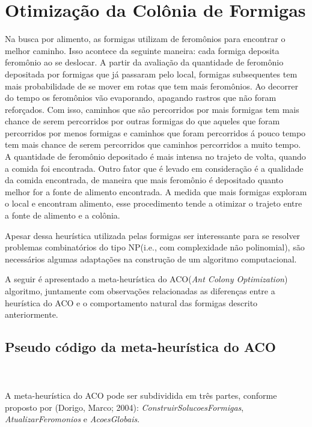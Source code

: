 \section{Otimização da Colônia de Formigas}

Na busca por alimento, as formigas utilizam de feromônios para encontrar o melhor caminho.
Isso acontece da seguinte maneira: cada formiga deposita feromônio ao se deslocar. A partir
da avaliação da quantidade de feromônio depositada por formigas que já passaram pelo local,
formigas subsequentes tem mais probabilidade de se mover em rotas que tem mais feromônios. Ao
decorrer do tempo os feromônios vão evaporando, apagando rastros que não foram reforçados. 
Com isso, caminhos que são percorridos por mais formigas tem mais chance de serem 
percorridos por outras formigas do que aqueles que foram percorridos por menos formigas e 
caminhos que foram percorridos á pouco tempo tem mais chance de serem percorridos que caminhos
percorridos a muito tempo. A quantidade de feromônio depositado é mais intensa no trajeto de volta,
quando a comida foi encontrada. Outro fator que é levado em consideração é a qualidade da comida
encontrada, de maneira que mais feromônio é depositado quanto melhor for a fonte de alimento encontrada.
A medida que mais formigas exploram o local e encontram alimento, esse procedimento tende a otimizar o
trajeto entre a fonte de alimento e a colônia.

Apesar dessa heurística utilizada pelas formigas ser interessante para se resolver problemas combinatórios 
do tipo NP(i.e., com complexidade não polinomial), são necessários algumas adaptações na construção
de um algoritmo computacional.

A seguir é apresentado a meta-heurística do ACO(\textit{Ant Colony Optimization}) algoritmo, juntamente com observações relacionadas as diferenças
entre a heurística do ACO e o comportamento natural das formigas descrito anteriormente.

\subsection{Pseudo código da meta-heurística do ACO}
\begin{algorithm}[H]
 
}

\caption{Pseudo código da meta-heurística do ACO}\label{meta-heuristica_aco}
\end{algorithm}
\\
\\
A meta-heurística do ACO pode ser subdividida em três partes, 
conforme proposto por (Dorigo, Marco; 2004): \textit{ConstruirSolucoesFormigas}, 
\textit{AtualizarFeromonios} e \textit{AcoesGlobais}.

